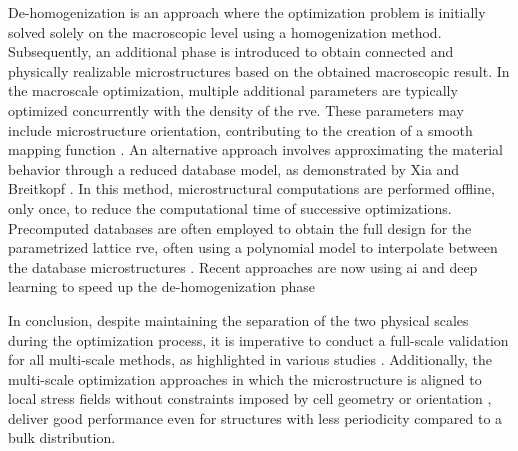 De-homogenization is an approach where the optimization problem is initially solved solely on the macroscopic level using a homogenization method. Subsequently, an additional phase is introduced to obtain connected and physically realizable microstructures based on the obtained macroscopic result. In the macroscale optimization, multiple additional parameters are typically optimized concurrently with the density of the \gls{rve}. These parameters may include microstructure orientation, contributing to the creation of a smooth mapping function . An alternative approach involves approximating the material behavior through a reduced database model, as demonstrated by Xia and Breitkopf . In this method, microstructural computations are performed offline, only once, to reduce the computational time of successive optimizations. Precomputed databases are often employed to obtain the full design for the parametrized lattice \gls{rve}, often using a polynomial model to interpolate between the database microstructures . Recent approaches are now using \gls{ai} and deep learning to speed up the de-homogenization phase~ 

In conclusion, despite maintaining the separation of the two physical scales during the optimization process, it is imperative to conduct a full-scale validation for all multi-scale methods, as highlighted in various studies . Additionally, the multi-scale optimization approaches in which the microstructure is aligned to local stress fields without constraints imposed by cell geometry or orientation \cite{groen_homogenization-based_2018}, deliver good performance even for structures with less periodicity compared to a bulk distribution.


